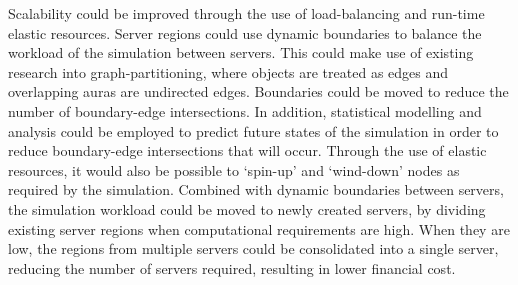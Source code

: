 Scalability could be improved through the use of load-balancing and run-time elastic resources. Server regions could use dynamic boundaries to balance the workload of the simulation between servers. This could make use of existing research into graph-partitioning, where objects are treated as edges and overlapping auras are undirected edges. Boundaries could be moved to reduce the number of boundary-edge intersections. In addition, statistical modelling and analysis could be employed to predict future states of the simulation in order to reduce boundary-edge intersections that will occur. Through the use of elastic resources, it would also be possible to `spin-up' and `wind-down' nodes as required by the simulation. Combined with dynamic boundaries between servers, the simulation workload could be moved to newly created servers, by dividing existing server regions when computational requirements are high. When they are low, the regions from multiple servers could be consolidated into a single server, reducing the number of servers required, resulting in lower financial cost.




